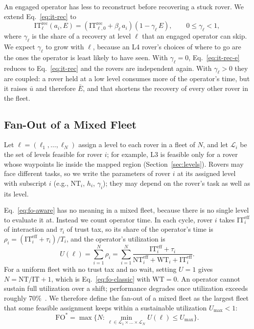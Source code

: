 \documentclass[conference]{IEEEtran}
\begin{document}
An engaged operator has less to reconstruct before recovering a stuck
rover. We extend Eq.~\eqref{eq:it-rec} to
\begin{equation}
  \mathrm{IT}^{\mathrm{rec}}_\ell(a_i, E) =
  \left( \mathrm{IT}^{\mathrm{rec}}_{\ell,0} + \beta_\ell\, a_i \right)
  \left( 1 - \gamma_\ell\, E \right),
  \qquad 0 \le \gamma_\ell < 1 ,
  \label{eq:it-rec-e}
\end{equation}
where $\gamma_\ell$ is the share of a recovery at level $\ell$ that an
engaged operator can skip. We expect $\gamma_\ell$ to grow with
$\ell$, because an L4 rover's choices of where to go are the ones the
operator is least likely to have seen. With $\gamma_\ell = 0$,
Eq.~\eqref{eq:it-rec-e} reduces to Eq.~\eqref{eq:it-rec} and the
rovers are independent again. With $\gamma_\ell > 0$ they are
coupled: a rover held at a low level consumes more of the operator's
time, but it raises $\bar{u}$ and therefore $\bar{E}$, and that
shortens the recovery of every other rover in the fleet.

\subsection{Fan-Out of a Mixed Fleet}
\label{sec:fo-mixed}
Let $\boldsymbol{\ell} = (\ell_1, \dots, \ell_N)$ assign a level to
each rover in a fleet of $N$, and let $\mathcal{L}_i$ be the set of
levels feasible for rover $i$; for example, L3 is feasible only for a
rover whose waypoints lie inside the mapped region
(Section~\ref{sec:levels}). Rovers may face different tasks, so we
write the parameters of rover $i$ at its assigned level with subscript
$i$ (e.g., $\mathrm{NT}_i$, $h_i$, $\gamma_i$); they may depend on the
rover's task as well as its level.

Eq.~\eqref{eq:fo-aware} has no meaning in a mixed fleet, because there
is no single level to evaluate it at. Instead we count operator time.
In each cycle, rover $i$ takes $\mathrm{IT}^{\mathrm{eff}}_i$ of
interaction and $\tau_i$ of trust tax, so its share of the operator's
time is $\rho_i = (\mathrm{IT}^{\mathrm{eff}}_i + \tau_i)/T_i$, and the
operator's utilization is
\begin{equation}
  U(\boldsymbol{\ell}) = \sum_{i=1}^{N} \rho_i
  = \sum_{i=1}^{N} \frac{\mathrm{IT}^{\mathrm{eff}}_i + \tau_i}
                         {\mathrm{NT}^{\mathrm{eff}}_i + \mathrm{WT}_i + \mathrm{IT}^{\mathrm{eff}}_i} .
  \label{eq:utilization}
\end{equation}
For a uniform fleet with no trust tax and no wait, setting $U = 1$
gives $N = \mathrm{NT}/\mathrm{IT} + 1$, which is
Eq.~\eqref{eq:fo-classic} with $\mathrm{WT} = 0$. An operator cannot
sustain full utilization over a shift; performance degrades once
utilization exceeds roughly 70\%~\cite{cummings2007developing}. We
therefore define the fan-out of a mixed fleet as the largest fleet
that some feasible assignment keeps within a sustainable utilization
$U_{\max} < 1$:
\begin{equation}
  \mathrm{FO}^{*} = \max \Big\{ N : \min_{\boldsymbol{\ell} \in
  \mathcal{L}_1 \times \dots \times \mathcal{L}_N}
  U(\boldsymbol{\ell}) \le U_{\max} \Big\} .
  \label{eq:fo-mixed}
\end{equation}
\end{document}
